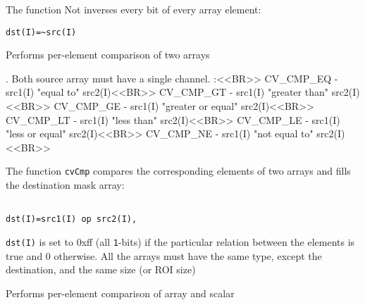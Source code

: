 \begin{description}
\end{description}


The function Not inverses every bit of every array element:

\begin{lstlisting}
dst(I)=~src(I)
\end{lstlisting}


\label{Cmp}

Performs per-element comparison of two arrays


\begin{description}
. Both source array must have a single channel.
:<<BR>> CV\_CMP\_EQ - src1(I) "equal to" src2(I)<<BR>> CV\_CMP\_GT - src1(I) "greater than" src2(I)<<BR>> CV\_CMP\_GE - src1(I) "greater or equal" src2(I)<<BR>> CV\_CMP\_LT - src1(I) "less than" src2(I)<<BR>> CV\_CMP\_LE - src1(I) "less or equal" src2(I)<<BR>> CV\_CMP\_NE - src1(I) "not equal to" src2(I)<<BR>>
\end{description}

The function \texttt{cvCmp} compares the corresponding elements of two arrays and fills the destination mask array:

\begin{lstlisting}

dst(I)=src1(I) op src2(I),

\end{lstlisting}

\texttt{dst(I)} is set to 0xff (all \texttt{1}-bits) if the particular relation between the elements is true and 0 otherwise. All the arrays must have the same type, except the destination, and the same size (or ROI size)

\label{CmpS}

Performs per-element comparison of array and scalar


